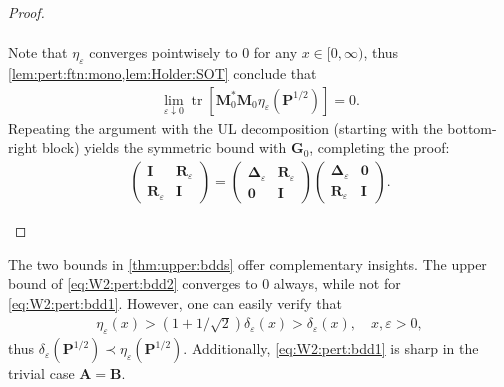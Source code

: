\documentclass[noinfoline]{imsart}\setcounter{tocdepth}{2}
\newcommand{\m}[1]{\mathbf{#1}}
\DeclareMathOperator{\tr}{tr}
\theoremstyle{plain}
\begin{document}
\begin{proof}
\begin{enumerate}[leftmargin = *]
\begin{align*}
\end{align*}
Note that $\eta_{\varepsilon}$ converges pointwisely to $0$ for any $x \in [0, \infty)$, thus \cref{lem:pert:ftn:mono,lem:Holder:SOT} conclude that 
\begin{align*}
    \lim_{\varepsilon \downarrow 0} \tr \left[ \m{M}_{0}^{*} \m{M}_{0} \eta_{\varepsilon} (\m{P}^{1/2}) \right] = 0.
\end{align*}
Repeating the argument with the UL decomposition (starting with the bottom-right block) yields the symmetric bound with $\m{G}_{0}$, completing the proof:
\begin{align*}
    \left(
    \begin{array}{c|c}
    \m{I} & \m{R}_{\varepsilon} \\
    \hline
    \m{R}_{\varepsilon} & \m{I}
    \end{array}
    \right) = \left(
    \begin{array}{c|c}
    \m{\Delta}_{\varepsilon} & \m{R}_{\varepsilon} \\
    \hline
    \m{0} & \m{I}
    \end{array}
    \right) \left(
    \begin{array}{c|c}
    \m{\Delta}_{\varepsilon} & \m{0} \\
    \hline
    \m{R}_{\varepsilon} & \m{I}
    \end{array}
    \right).
\end{align*}
\end{enumerate}
\end{proof}

The two bounds in \cref{thm:upper:bdds} offer complementary insights. The upper bound of \eqref{eq:W2:pert:bdd2} converges to $0$ always, while not for \eqref{eq:W2:pert:bdd1}. However, one can easily verify that 
\begin{align*}
    \eta_{\varepsilon}(x) > (1+1/\sqrt{2}) \delta_{\varepsilon}(x) > \delta_{\varepsilon}(x), \quad x, \varepsilon > 0,
\end{align*}
thus $\delta_{\varepsilon}(\m{P}^{1/2}) \prec \eta_{\varepsilon}(\m{P}^{1/2})$. Additionally, \eqref{eq:W2:pert:bdd1} is sharp in the trivial case $\m{A} = \m{B}$.
\end{document}

